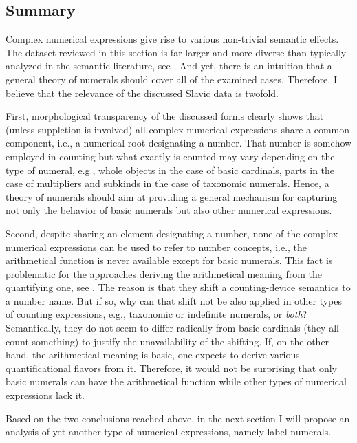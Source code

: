 \documentclass[output=paper]{langscibook}
\begin{document}
\subsection{Summary}\label{sec:summary}

Complex numerical expressions give rise to various non-trivial semantic effects. The dataset reviewed in this section is far larger and more diverse than typically analyzed in the semantic literature, see . And yet, there is an intuition that a general theory of numerals should cover all of the examined cases. Therefore, I believe that the relevance of the discussed Slavic data is twofold.

First, morphological transparency of the discussed forms clearly shows that (unless suppletion is involved) all complex numerical expressions share a common component, i.e., a numerical root designating a number. That number is somehow employed in counting but what exactly is counted may vary depending on the type of numeral, e.g., whole objects in the case of basic cardinals, parts in the case of multipliers and subkinds in the case of taxonomic numerals. Hence, a theory of numerals should aim at providing a general mechanism for capturing not only the behavior of basic numerals but also other numerical expressions. 

Second, despite sharing an element designating a number, none of the complex numerical expressions can be used to refer to number concepts, i.e., the arithmetical function is never available except for basic numerals. This fact is problematic for the approaches deriving the arithmetical meaning from the quantifying one, see . The reason is that they shift a counting-device semantics to a number name. But if so, why can that shift not be also applied in other types of counting expressions, e.g., taxonomic or indefinite numerals, or \textit{both}? Semantically, they do not seem to differ radically from basic cardinals (they all count something) to justify the unavailability of the shifting. If, on the other hand, the arithmetical meaning is basic, one expects to derive various quantificational flavors from it. Therefore, it would not be surprising that only basic numerals can have the arithmetical function while other types of numerical expressions lack it. 

Based on the two conclusions reached above, in the next section I will propose an analysis of yet another type of numerical expressions, namely label numerals.
\end{document}
